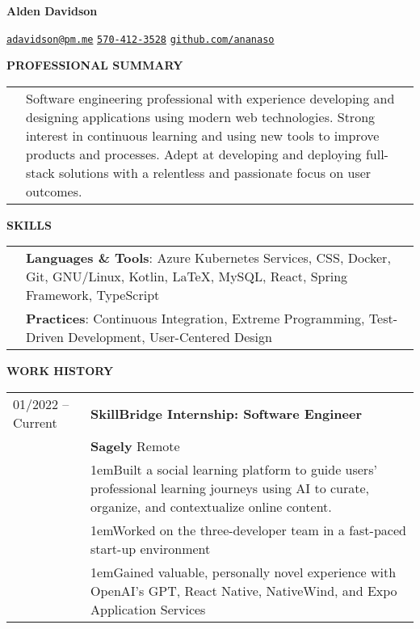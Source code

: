 \documentclass[11pt]{article}
\newlength{\dateColumnWidth}
\newcommand{\customBulletLabel}{\raisebox{0.4ex}{\tiny$\bullet$}}
\newcommand{\detail}{\par\noindent\makebox[1em][l]{\customBulletLabel}\hangindent1em}
\begin{document}
\begin{center}
    \begin{minipage}{0.70\textwidth}
        {\Huge\textbf{Alden Davidson}}
    \end{minipage}%
    \begin{minipage}{0.30\textwidth}
        \raggedleft
        \href{mailto:adavidson@pm.me}{\nolinkurl{adavidson@pm.me}}
        \href{tel:5704123528}{\nolinkurl{570-412-3528}}
        \href{https://github.com/ananaso}{\nolinkurl{github.com/ananaso}}
    \end{minipage}
\end{center}
{\Large \textbf{PROFESSIONAL SUMMARY}}
\bigbreak
\begin{tabularx}{\textwidth}{@{}p{\dateColumnWidth}X@{}}
     & Software engineering professional with experience developing and designing applications using modern web technologies.
    Strong interest in continuous learning and using new tools to improve products and processes.
    Adept at developing and deploying full-stack solutions with a relentless and passionate focus on user outcomes.
\end{tabularx}
\bigbreak
{\Large \textbf{SKILLS}}
\bigbreak
\begin{tabularx}{\textwidth}{@{}p{\dateColumnWidth}X@{}}
     & \textbf{Languages \& Tools}: Azure Kubernetes Services, CSS, Docker, Git, GNU/Linux, Kotlin, \LaTeX, MySQL, React, Spring Framework, TypeScript \\
     & \textbf{Practices}: Continuous Integration, Extreme Programming, Test-Driven Development, User-Centered Design                                  \\
\end{tabularx}
\bigbreak
{\Large \textbf{WORK HISTORY}}
\bigbreak
\begin{tabularx}{\textwidth}{@{}p{\dateColumnWidth}X@{}}
    01/2022 -- Current & \textbf{SkillBridge Internship: Software Engineer}                                                                                                      \\
                       & \textbf{Sagely} \textbar{} Remote                                                                                                                       \\
                       & \detail Built a social learning platform to guide users' professional learning journeys using AI to curate, organize, and contextualize online content. \\
                       & \detail Worked on the three-developer team in a fast-paced start-up environment                                                                         \\
                       & \detail Gained valuable, personally novel experience with OpenAI's GPT, React Native, NativeWind, and Expo Application Services
\end{tabularx}
\end{document}
